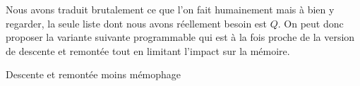Nous avons traduit brutalement ce que l'on fait humainement mais à bien y regarder, la seule liste dont nous avons réellement besoin est $Q$. 
On peut donc proposer la variante suivante programmable qui est à la fois proche de la version de descente et remontée tout en limitant l'impact sur la mémoire.


\begin{algo}
	\caption{Descente et remontée moins mémophage} \label{algo-human-paper-bis}
	\addalgoblank
\end{algo}


